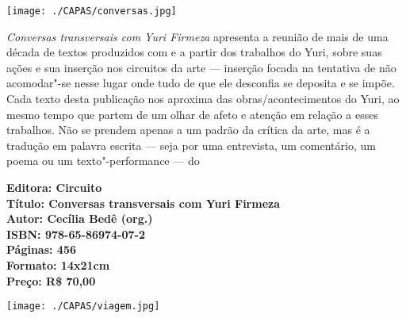 \pagebreak

\begin{center}
\hspace*{-3.6cm}
\hspace*{3.1cm}\texttt{[image: ./CAPAS/conversas.jpg]}
\end{center}

\hspace*{-7cm}\hrulefill\hspace*{-7cm}

\medskip

\noindent{}\textit{Conversas transversais com Yuri Firmeza} apresenta a reunião de mais de uma década de textos produzidos com e a partir dos trabalhos do Yuri, sobre suas ações e sua inserção nos circuitos da arte — inserção focada na tentativa de não acomodar"-se nesse lugar onde tudo de que ele desconfia se deposita e se impõe.
Cada texto desta publicação nos aproxima das obras/acontecimentos do Yuri, ao mesmo tempo que partem de um olhar de afeto e atenção em relação a esses trabalhos. Não se prendem apenas a um padrão da crítica da arte, mas é a tradução em palavra escrita --- seja por uma entrevista, um comentário, um poema ou um texto"-performance --- do 


\vfill

\hspace*{-.4cm}\begin{minipage}[c]{1\linewidth}
\small\textbf{
\hspace*{-.1cm}Editora: Circuito\\
Título: Conversas transversais com Yuri Firmeza\\
Autor: Cecília Bedê (org.)\\ 
ISBN: 978-65-86974-07-2\\
Páginas: 456\\
Formato: 14x21cm\\
Preço: R\$ 70,00\\
}
\end{minipage}



\pagebreak

\begin{center}
\hspace*{.5cm}\texttt{[image: ./CAPAS/viagem.jpg]}
\end{center}

